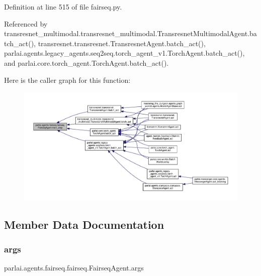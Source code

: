 Definition at line 515 of file fairseq.\+py.



Referenced by transresnet\+\_\+multimodal.\+transresnet\+\_\+multimodal.\+Transresnet\+Multimodal\+Agent.\+batch\+\_\+act(), transresnet.\+transresnet.\+Transresnet\+Agent.\+batch\+\_\+act(), parlai.\+agents.\+legacy\+\_\+agents.\+seq2seq.\+torch\+\_\+agent\+\_\+v1.\+Torch\+Agent.\+batch\+\_\+act(), and parlai.\+core.\+torch\+\_\+agent.\+Torch\+Agent.\+batch\+\_\+act().

Here is the caller graph for this function\+:
\nopagebreak
\begin{figure}[H]
\begin{center}
\leavevmode
\includegraphics[width=350pt]{classparlai_1_1agents_1_1fairseq_1_1fairseq_1_1FairseqAgent_a57902d8fdb473ce9d791df532db41eee_icgraph}
\end{center}
\end{figure}


\subsection{Member Data Documentation}
\mbox{\label{classparlai_1_1agents_1_1fairseq_1_1fairseq_1_1FairseqAgent_a46b06885bc5c7feb87947788f74939aa}} 
\subsubsection{\texorpdfstring{args}{args}}
{\footnotesize\ttfamily parlai.\+agents.\+fairseq.\+fairseq.\+Fairseq\+Agent.\+args}



